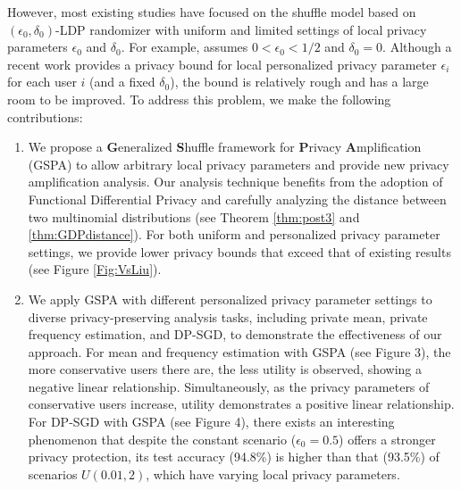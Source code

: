 \documentclass[letterpaper]{article} %
\begin{document}
However, most existing studies have focused on the shuffle model based on $(\epsilon_0,\delta_0)$-LDP randomizer with uniform and limited settings of local privacy parameters $\epsilon_0$ and $\delta_0$.
For example,  \citealt{Erlingsson2019amplification} assumes $0<\epsilon_0<1/2$ and $\delta_0 = 0$.
Although a recent work \citealt{Liu2023} provides a privacy bound for local personalized privacy parameter $\epsilon_i$  for each user $i$ (and a fixed $\delta_0$), the bound is relatively rough and has a large room to be improved.
To address this problem, we make the following contributions:
\begin{enumerate}
  \item We propose a {\bf G}eneralized {\bf S}huffle framework for {\bf P}rivacy {\bf A}mplification (GSPA) to allow arbitrary local privacy parameters and provide new privacy amplification analysis.
Our analysis technique benefits from the adoption of Functional Differential Privacy \cite{Dong2022gaussian} and carefully analyzing the distance between two multinomial distributions (see Theorem \ref{thm:post3} and \ref{thm:GDPdistance}). 
For both uniform and personalized privacy parameter settings, we provide lower privacy bounds that exceed that of existing results (see Figure \ref{Fig:VsLiu}).
  
\item We apply GSPA with different personalized privacy parameter settings to diverse privacy-preserving analysis tasks, including private mean, private frequency estimation, and DP-SGD, to demonstrate the effectiveness of our approach. 
For mean and frequency estimation with GSPA (see Figure 3), the more conservative users there are, the less utility is observed, showing a negative linear relationship. Simultaneously, as the privacy parameters of conservative users increase, utility demonstrates a positive linear relationship.
For DP-SGD with GSPA (see Figure 4), there exists an interesting phenomenon that despite the constant scenario ($\epsilon_0=0.5$) offers a stronger privacy protection, its test accuracy (94.8\%) is higher than that (93.5\%) of scenarios $U(0.01,2)$, which have varying local privacy parameters.
\end{enumerate}
\end{document}
